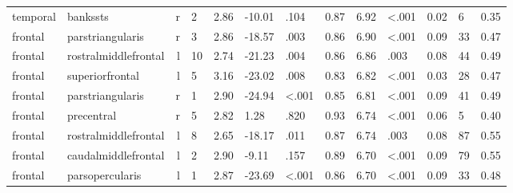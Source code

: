 \documentclass{article}
\begin{document}
\begin{longtable}{llrR{1.3cm}R{1cm}R{1.3cm}R{1cm}R{1cm}R{1.3cm}R{1cm}R{1.8cm}R{1.3cm}R{1.8cm}}
  temporal &                  bankssts &    r &         2 &                  2.86 &           -10.01 &               .104 &                               0.87 &                          6.92 &                   \textless.001 &   0.02 &      6 &      0.35 \\
   frontal &          parstriangularis &    r &         3 &                  2.86 &           -18.57 &               .003 &                               0.86 &                          6.90 &                   \textless.001 &   0.09 &     33 &      0.47 \\
   frontal &      rostralmiddlefrontal &    l &        10 &                  2.74 &           -21.23 &               .004 &                               0.86 &                          6.86 &                            .003 &   0.08 &     44 &      0.49 \\
   frontal &           superiorfrontal &    l &         5 &                  3.16 &           -23.02 &               .008 &                               0.83 &                          6.82 &                   \textless.001 &   0.03 &     28 &      0.47 \\
   frontal &          parstriangularis &    r &         1 &                  2.90 &           -24.94 &      \textless.001 &                               0.85 &                          6.81 &                   \textless.001 &   0.09 &     41 &      0.49 \\
   frontal &                precentral &    r &         5 &                  2.82 &             1.28 &               .820 &                               0.93 &                          6.74 &                   \textless.001 &   0.06 &      5 &      0.40 \\
   frontal &      rostralmiddlefrontal &    l &         8 &                  2.65 &           -18.17 &               .011 &                               0.87 &                          6.74 &                            .003 &   0.08 &     87 &      0.55 \\
   frontal &       caudalmiddlefrontal &    l &         2 &                  2.90 &            -9.11 &               .157 &                               0.89 &                          6.70 &                   \textless.001 &   0.09 &     79 &      0.55 \\
   frontal &           parsopercularis &    l &         1 &                  2.87 &           -23.69 &      \textless.001 &                               0.86 &                          6.70 &                   \textless.001 &   0.09 &     33 &      0.48 \\

\end{longtable}
\end{document}
